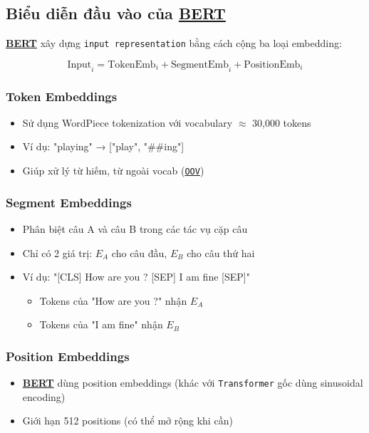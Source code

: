 \subsection{Biểu diễn đầu vào của \hyperref[acro:bert]{\textbf{BERT}}}
\label{ssec:input_representation_bert}

\hyperref[acro:bert]{\textbf{BERT}} xây dựng \texttt{input representation} bằng cách cộng ba loại embedding:

\begin{equation}
\text{Input}_i = \text{TokenEmb}_i + \text{SegmentEmb}_i + \text{PositionEmb}_i
\label{eq:input_embedding}
\end{equation}

\subsubsection{Token Embeddings}
\begin{itemize}
    \item Sử dụng WordPiece tokenization \cite{wu2016google} với vocabulary $\approx$ 30,000 tokens
    \item Ví dụ: "playing" → ["play", "\#\#ing"]
    \item Giúp xử lý từ hiếm, từ ngoài vocab (\hyperref[acro:oov]{\texttt{OOV}})
\end{itemize}

\subsubsection{Segment Embeddings}  
\begin{itemize}
    \item Phân biệt câu A và câu B trong các tác vụ cặp câu
    \item Chỉ có 2 giá trị: $E_A$ cho câu đầu, $E_B$ cho câu thứ hai
    \item Ví dụ: "[CLS] How are you ? [SEP] I am fine [SEP]"
    \begin{itemize}
        \item Tokens của "How are you ?" nhận $E_A$
        \item Tokens của "I am fine" nhận $E_B$
    \end{itemize}
\end{itemize}

\subsubsection{Position Embeddings}
\begin{itemize}
    \item \hyperref[acro:bert]{\textbf{BERT}} dùng position embeddings (khác với \texttt{Transformer} gốc dùng sinusoidal encoding)
    \item Giới hạn 512 positions (có thể mở rộng khi cần)
\end{itemize}

